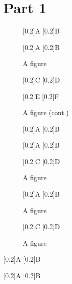 \documentclass[a4paper]{article}
\begin{document}
\listoffigures
\listoftables

\clearpage
\section{Part 1}

\begin{figure}[H]
\centering
\subcaptionbox{}[0.2\textwidth]{A}
\subcaptionbox{}[0.2\textwidth]{B}
\caption{A figure}
\bigskip
\subcaptionbox{}[0.2\textwidth]{A}
\subcaptionbox{}[0.2\textwidth]{B}
\caption{A figure}
\end{figure}

\begin{figure}[H]
\ContinuedFloat
\centering
\subcaptionbox{}[0.2\textwidth]{C}
\subcaptionbox{}[0.2\textwidth]{D}
\caption[]{A figure (cont.)}
\bigskip
\ContinuedFloat
\subcaptionbox{}[0.2\textwidth]{E}
\subcaptionbox{}[0.2\textwidth]{F}
\caption[]{A figure (cont.)}
\end{figure}

\begin{figure}[H]
\centering
\subcaptionbox{}[0.2\textwidth]{A}
\subcaptionbox{}[0.2\textwidth]{B}
\flushsubcaptionlistentries %
\end{figure}
\begin{figure}[H]
\centering
\subcaptionbox{}[0.2\textwidth]{A}
\subcaptionbox{}[0.2\textwidth]{B}
\end{figure}
\begin{figure}[H]
\ContinuedFloat
\centering
\subcaptionbox{}[0.2\textwidth]{C}
\subcaptionbox{}[0.2\textwidth]{D}
\caption{A figure}
\end{figure}

\begin{figure}
\centering
\subcaptionbox{}[0.2\textwidth]{A}
\subcaptionbox{}[0.2\textwidth]{B}
\caption{A figure}
\end{figure}

\begin{figure}
\ContinuedFloat
\centering
\subcaptionbox{}[0.2\textwidth]{C}
\subcaptionbox{}[0.2\textwidth]{D}
\caption[]{A figure}
\end{figure}

\clearpage

\begin{table}[H]
\caption{A table}
\centering
\subcaptionbox{}[0.2\textwidth]{A}
\subcaptionbox{}[0.2\textwidth]{B}
\bigskip
\caption{A table}
\subcaptionbox{}[0.2\textwidth]{A}
\subcaptionbox{}[0.2\textwidth]{B}
\end{table}
\end{document}
